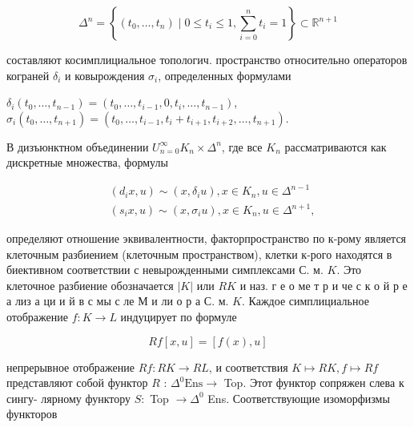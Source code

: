 \documentclass[10pt]{article}
\begin{document}
\[

\Delta^{n}=\left\{\left(t_{0}, \ldots, t_{n}\right) \mid 0 \leqslant t_{i} \leqslant 1, \sum_{i=0}^{n} t_{i}=1\right\} \subset \mathbb{R}^{n+1}

\]



составляют косимплициальное топологич. пространство относительно операторов кограней $\delta_{i}$ и ковырождения $\sigma_{i}$, определенных формулами



$\delta_{i}\left(t_{0}, \ldots, t_{n-1}\right)=\left(t_{0}, \ldots, t_{i-1}, 0, t_{i}, \ldots, t_{n-1}\right)$, $\sigma_{i}\left(t_{0}, \ldots, t_{n+1}\right)=\left(t_{0}, \ldots, t_{i-1}, t_{i}+t_{i+1}, t_{i+2}, \ldots, t_{n+1}\right)$.



В дизъюнктном объединении $U_{n=0}^{\infty} K_{n} \times \Delta^{n}$, где все $K_{n}$ рассматриваются как дискретные множества, формулы



\[

\begin{aligned}

& \left(d_{i} x, u\right) \sim\left(x, \delta_{i} u\right), x \in K_{n}, u \in \Delta^{n-1} \\

& \left(s_{i} x, u\right) \sim\left(x, \sigma_{i} u\right), x \in K_{n}, u \in \Delta^{n+1},

\end{aligned}

\]



определяют отношение эквивалентности, факторпространство по к-рому является клеточным разбиением (клеточным пространством), клетки к-рого находятся в биективном соответствии с невырожденными симплексами С. м. $K$. Это клеточное разбиение обозначается $|K|$ или $R K$ и наз. г е о ме т р и че с к о й р е а лиз а ци и й в с мы с ле М и ли о р а С. м. $K$. Каждое симплициальное отображение $f: K \rightarrow L$ индуцирует по формуле



\[

R f[x, u]=[f(x), u]

\]



непрерывное отображение $R f: R K \rightarrow R L$, и соответствия $K \mapsto R K, f \mapsto R f$ представляют собой функтор $R$ : $\Delta^{0} \mathrm{Ens} \rightarrow$ Top. Этот функтор сопряжен слева к сингу- лярному функтору $S:$ Top $\rightarrow \Delta^{0}$ Ens. Соответствующие изоморфизмы функторов
\end{document}
